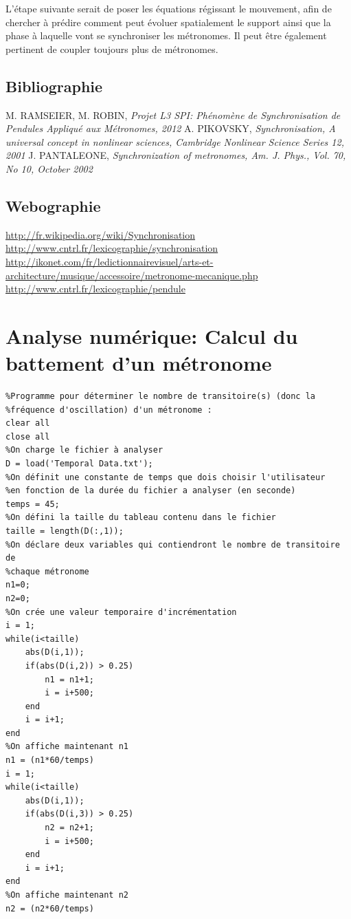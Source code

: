 \documentclass[a4paper,11pt]{report}
\begin{document}
L'étape suivante serait de poser les équations régissant le mouvement, afin de chercher à prédire comment peut évoluer spatialement le support ainsi que la phase à laquelle vont se synchroniser les métronomes. Il peut être également pertinent de coupler toujours plus de métronomes.
\renewcommand{\bibname}{Références}
\begin{thebibliography}{2}
\section*{Bibliographie}
 M. RAMSEIER, M. ROBIN, {\it Projet L3 SPI: Phénomène de Synchronisation de Pendules Appliqué aux Métronomes, 2012}
 A. PIKOVSKY, {\it Synchronisation, A universal concept in nonlinear sciences, Cambridge Nonlinear Science Series 12, 2001}
 J. PANTALEONE, {\it Synchronization of metronomes, Am. J. Phys., Vol. 70, No 10, October 2002}
\section*{Webographie}
 \url{http://fr.wikipedia.org/wiki/Synchronisation}
 \url{http://www.cntrl.fr/lexicographie/synchronisation}
 \url{http://ikonet.com/fr/ledictionnairevisuel/arts-et-architecture/musique/accessoire/metronome-mecanique.php}
 \url{http://www.cntrl.fr/lexicographie/pendule}
\end{thebibliography}
\appendix
\chapter{Analyse numérique: Calcul du battement d'un métronome}
\label{Battements}
\begin{verbatim}
%Programme pour déterminer le nombre de transitoire(s) (donc la 
%fréquence d'oscillation) d'un métronome :
clear all
close all
%On charge le fichier à analyser
D = load('Temporal Data.txt');
%On définit une constante de temps que dois choisir l'utilisateur 
%en fonction de la durée du fichier a analyser (en seconde)
temps = 45;
%On défini la taille du tableau contenu dans le fichier
taille = length(D(:,1));
%On déclare deux variables qui contiendront le nombre de transitoire de
%chaque métronome
n1=0;
n2=0;
%On crée une valeur temporaire d'incrémentation
i = 1;
while(i<taille)
    abs(D(i,1));
    if(abs(D(i,2)) > 0.25)
        n1 = n1+1;
        i = i+500;
    end
    i = i+1;
end
%On affiche maintenant n1
n1 = (n1*60/temps)
i = 1;
while(i<taille)
    abs(D(i,1));
    if(abs(D(i,3)) > 0.25)
        n2 = n2+1;
        i = i+500;
    end
    i = i+1;
end
%On affiche maintenant n2
n2 = (n2*60/temps)
\end{verbatim}
\end{document}
